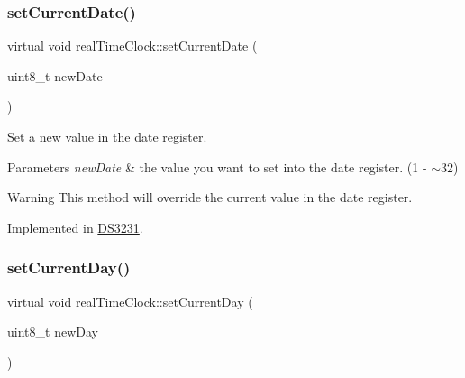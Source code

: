 \mbox{\label{classreal_time_clock_a7db563a518ae7b87ca6d77860906e517}} 
\subsubsection{\texorpdfstring{set\+Current\+Date()}{setCurrentDate()}}
{\footnotesize\ttfamily virtual void real\+Time\+Clock\+::set\+Current\+Date (\begin{DoxyParamCaption}\item[{uint8\+\_\+t}]{new\+Date }\end{DoxyParamCaption})\hspace{0.3cm}{\ttfamily [pure virtual]}}



Set a new value in the date register. 


\begin{DoxyParams}{Parameters}
{\em new\+Date} & the value you want to set into the date register. (1 -\/ $\sim$32) \\
\hline
\end{DoxyParams}
\begin{DoxyWarning}{Warning}
This method will override the current value in the date register. 
\end{DoxyWarning}


Implemented in \mbox{\hyperlink{class_d_s3231_a597a0d5cb33f8b60f81dba9050ca1363}{D\+S3231}}.

\mbox{\label{classreal_time_clock_a4a80a695cbb55860921f92509fae0cd0}} 
\subsubsection{\texorpdfstring{set\+Current\+Day()}{setCurrentDay()}}
{\footnotesize\ttfamily virtual void real\+Time\+Clock\+::set\+Current\+Day (\begin{DoxyParamCaption}\item[{uint8\+\_\+t}]{new\+Day }\end{DoxyParamCaption})\hspace{0.3cm}{\ttfamily [pure virtual]}}



